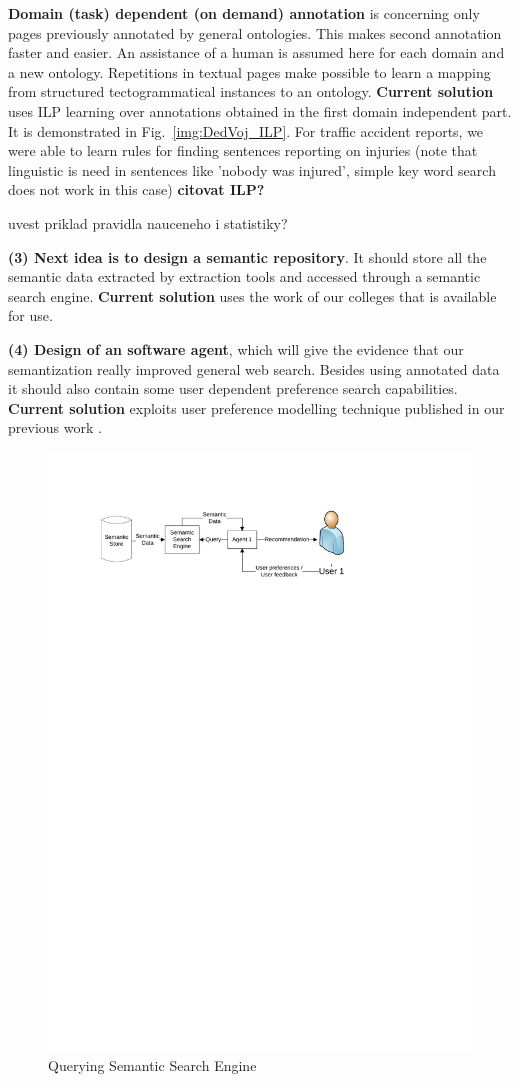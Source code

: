 \documentclass{www2009-submission}
\begin{document}
\textbf{Domain (task) dependent (on demand) annotation} is concerning only pages previously annotated by general ontologies. This makes second annotation faster and easier. An assistance of a human is assumed here for each domain and a new ontology. Repetitions in textual pages make possible to learn a mapping from structured tectogrammatical instances to an ontology. %
{\bf Current solution} uses ILP learning over annotations obtained in the first domain independent part. It is demonstrated in Fig.~\ref{img:DedVoj_ILP}. For traffic accident reports, we were able to learn rules for finding sentences reporting on injuries (note that linguistic is need in sentences like 'nobody was injured', simple key word search does not work in this case) {\bf citovat ILP?}

uvest priklad pravidla nauceneho i statistiky?

\textbf{(3) Next idea is to design a semantic repository}. It should store all the semantic data extracted by extraction tools and accessed through a semantic search engine. 
{\bf Current solution} uses the work of our colleges \cite{biblio:DoTySemanticWeb2007} that is available for use.


\textbf{(4) Design of an software agent}, which will give the evidence that our semantization really improved general web search. Besides using annotated data it should also contain some user dependent preference search capabilities. %
{\bf Current solution} exploits user preference modelling technique published in our previous work \cite{biblio:EcHoLearningdifferent2007}.



\begin{figure}
\centering
\includegraphics[width=\hsize, height=.3\hsize]{img/UserSearch}
\caption{Querying Semantic Search Engine}
\label{img:UserSearch}
\end{figure}
 
\end{document}
